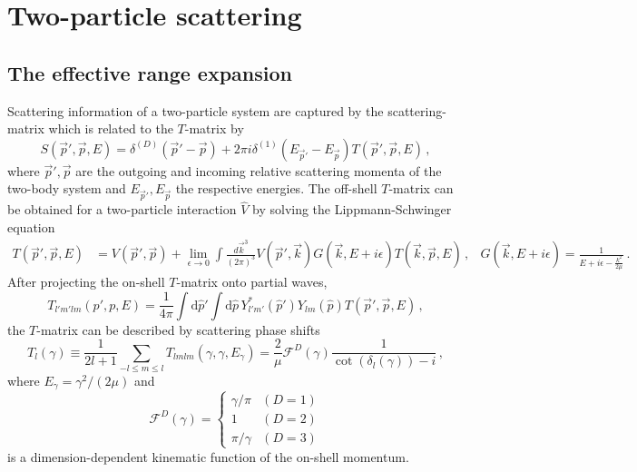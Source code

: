\section{Two-particle scattering}

\subsection{The effective range expansion}
Scattering information of a two-particle system are captured by the scattering-matrix which is related to the $T$-matrix by
\begin{equation}
    S(\vec p', \vec p, E)
    =
    \delta^{(D)}(\vec p' - \vec p)
    +
    2 \pi i  \delta^{(1)}(E_{\vec p'} - E_{\vec p})T(\vec p', \vec p, E)\, ,
\end{equation}
where $\vec p', \vec p$ are the outgoing and incoming relative scattering momenta of the two-body system and $E_{\vec p'}, E_{\vec p}$ the respective energies.
The off-shell $T$-matrix can be obtained for a two-particle interaction $\hat V$ by solving the Lippmann-Schwinger equation
\begin{align}
	T(\vec p', \vec p, E)
	&=
	V(\vec p', \vec p) + \lim\limits_{\epsilon \to 0}\int \frac{d \vec k^3}{(2\pi)^3} V(\vec p', \vec k) G(\vec k, E + i \epsilon) T(\vec k, \vec p, E) \, ,
	&
	G(\vec k, E+ i \epsilon) = \frac{1}{E + i \epsilon - \frac{k^2}{2\mu}}
	\, .
\end{align}
After projecting the on-shell $T$-matrix onto partial waves,
\begin{equation}
    T_{l' m' l m}(p', p, E)
    =
    \frac{1}{4\pi}
    \int \mathrm{d} \hat p' \int \mathrm{d} \hat p \,
    Y_{l'm'}^*(\hat p') Y_{lm}(\hat p)
    T(\vec p', \vec p, E)
    \, ,
\end{equation}
the $T$-matrix can be described by scattering phase shifts
\begin{equation}\label{eq:on-shell-T}
	T_l(\gamma) \equiv \frac{1}{2l+1} \sum_{-l \leq m \leq l} T_{l m l m}(\gamma, \gamma , E_\gamma)
    = \frac{2}{\mu}
    \mathcal F^{D}(\gamma) \frac{1}{\cot (\delta_l(\gamma)) - i} \, ,
\end{equation}
where $E_\gamma = \gamma^2 / (2 \mu)$ and
\begin{equation}\label{eq:spherical FD}
    \mathcal F^{D}(\gamma)
    =
    \begin{cases}
        \gamma/\pi     & (D=1)\\
        1       & (D=2)\\
        \pi/\gamma   & (D=3)
    \end{cases}
\end{equation}
is a dimension-dependent kinematic function of the on-shell momentum.

